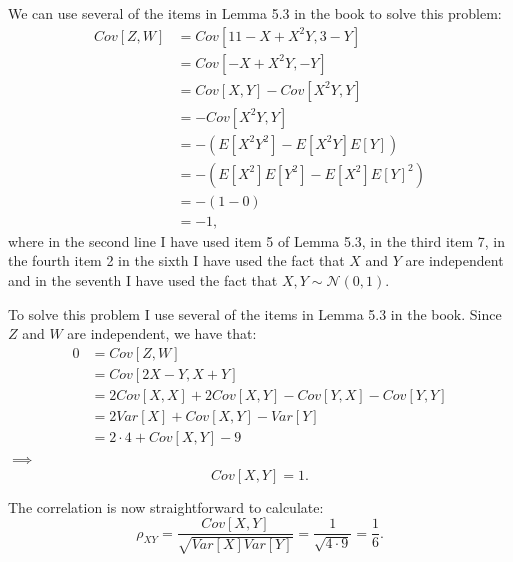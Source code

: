 \begin{problem}{32} We can use several of the items in Lemma 5.3 in the book to solve this problem:
\begin{align*}
Cov[Z, W] &= Cov[11-X+X^2Y, 3-Y] \\
& = Cov[-X+X^2Y, -Y] \\
& = Cov[X, Y]-Cov[X^2Y, Y] \\
&=-Cov[X^2Y, Y] \\
& = -\left (E[X^2Y^2] -E[X^2Y]E[Y] \right ) \\
& = -\left (E[X^2]E[Y^2] -E[X^2]E[Y]^2 \right ) \\
& =-(1-0) \\
&=-1,
\end{align*}
where in the second line I have used item 5 of Lemma 5.3, in the third item 7, in the fourth item 2 in the sixth I have used the fact that $X$ and $Y$ are independent and in the seventh I have used the fact that $X, Y \sim \mathcal N(0,1)$.
\end{problem}

\begin{problem}{33} To solve this problem I use several of the items in Lemma 5.3 in the book.  Since $Z$ and $W$ are independent, we have that:
\begin{align*}
0 &= Cov[Z, W] \\
& = Cov[2X-Y, X+Y] \\
& = 2Cov[X, X]+2Cov[X, Y]-Cov[Y, X]-Cov[Y, Y] \\
& = 2 Var[X] +Cov[X, Y]-Var[Y] \\
& = 2 \cdot 4+ Cov[X, Y]- 9
\end{align*}
$\implies$
\begin{equation*}
Cov[X, Y] = 1.
\end{equation*}

The correlation is now straightforward to calculate: 
\begin{equation*}
\rho_{XY} = \frac{Cov[X, Y]}{\sqrt{Var[X] Var[Y]}} = \frac{1}{\sqrt{4 \cdot 9}} =\frac{1}{6}.
\end{equation*}


\end{problem}



